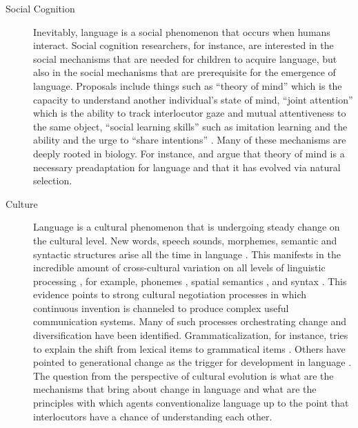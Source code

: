 \begin{description}
\item[Social Cognition] Inevitably, language is a social phenomenon that
occurs when humans interact. Social cognition researchers, for instance, 
are interested in the social mechanisms that are needed for children to acquire 
language, but also in the social mechanisms that are prerequisite for the emergence of language.
Proposals include things such as ``theory of mind'' \citep{dunbar1998theory} which
is the capacity to understand another individual's state of mind, 
``joint attention'' \citep{carpenter1998social}
which is the ability to track interlocutor gaze and mutual 
attentiveness to the same object, ``social learning skills'' such as imitation learning 
\citep{tomasello1992social} and the ability and the urge to ``share intentions'' 
\citep{tomasello2005understanding}. Many of these mechanisms are deeply rooted in biology.
For instance, \cite{dunbar2003social} and \cite{worden1998evolution} argue that
theory of mind is a necessary preadaptation for language and that it has 
evolved via natural selection.

\item[Culture] Language is a cultural phenomenon that is undergoing 
steady change on the cultural level. New words, speech sounds, morphemes,
semantic and syntactic structures arise all the time in language \citep{steels2011self-organization}.
This manifests in the incredible amount of cross-cultural variation
on all levels of linguistic processing \citep{evans2009universals}, for example, phonemes 
\citep{maddieson1984patterns,oudeyer2005self}, spatial semantics \citep{levinson2003space},
and syntax \citep{levinson2006grammars}. 
This evidence points to strong cultural negotiation processes in which continuous invention 
is channeled to produce complex useful communication systems.
Many of such processes orchestrating change and diversification have been identified.
Grammaticalization, for instance, tries to explain the shift from
lexical items to grammatical items \citep{hopper2003grammaticalization}.
Others have pointed to generational change as the trigger for 
development in language \citep{smith2003iterated}.
The question from the perspective of cultural evolution is what are the mechanisms 
that bring about change in language and what are the principles with
which agents conventionalize language up to the point that interlocutors 
have a chance of understanding each other.
\end{description}


